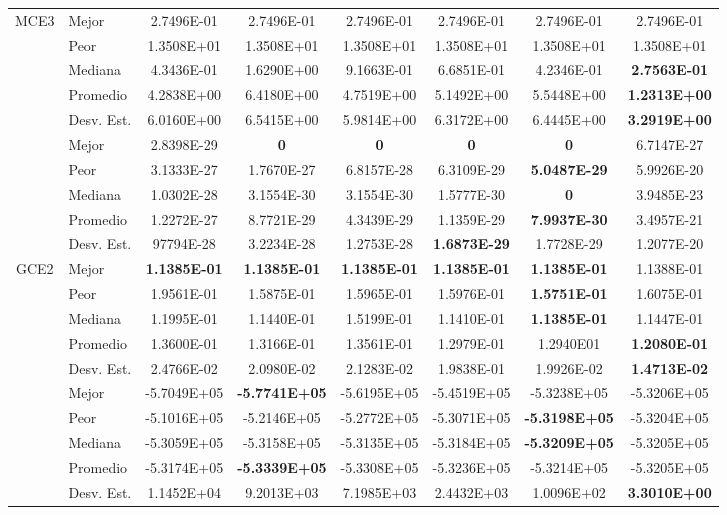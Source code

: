 \begin{table}
{\begin{tabular}{clcccccc}
			\multirow{6}{*}{MCE3} & Mejor       & 2.7496E-01 & 2.7496E-01 & 2.7496E-01 & 2.7496E-01 &  2.7496E-01 & 2.7496E-01 \\
			& Peor        & 1.3508E+01 & 1.3508E+01 & 1.3508E+01 & 1.3508E+01& 1.3508E+01 &  1.3508E+01 \\
			& Mediana     & 4.3436E-01  & 1.6290E+00& 9.1663E-01 & 6.6851E-01& 4.2346E-01 &\textbf{2.7563E-01} \\
			& Promedio    & 4.2838E+00 &  6.4180E+00& 4.7519E+00 & 5.1492E+00 & 5.5448E+00 & \textbf{1.2313E+00} \\
			& Desv. Est.  & 6.0160E+00  & 6.5415E+00& 5.9814E+00 & 6.3172E+00 & 6.4445E+00  &\textbf{3.2919E+00}\\
			\hline
			\multirow{6}{*}{GCE1} & Mejor        &2.8398E-29 & \textbf{0}          & \textbf{0}          &\textbf{0}           & \textbf{0}          &6.7147E-27 \\
			& Peor        & 3.1333E-27 & 1.7670E-27 & 6.8157E-28 & 6.3109E-29 &\textbf{5.0487E-29} & 5.9926E-20\\
			& Mediana     & 1.0302E-28 & 3.1554E-30 & 3.1554E-30 & 1.5777E-30 & \textbf{0}& 3.9485E-23 \\
			& Promedio    & 1.2272E-27 & 8.7721E-29  & 4.3439E-29 &1.1359E-29 & \textbf{7.9937E-30 }& 3.4957E-21 \\
			& Desv. Est.  & 97794E-28 & 3.2234E-28  & 1.2753E-28 & \textbf{1.6873E-29 }& 1.7728E-29  & 1.2077E-20\\
			\hline
			
			\multirow{6}{*}{GCE2} & Mejor        & \textbf{1.1385E-01 }& \textbf{1.1385E-01}  & \textbf{1.1385E-01 }& \textbf{1.1385E-01}& \textbf{1.1385E-01} & 1.1388E-01 \\
			& Peor        & 1.9561E-01 & 1.5875E-01  & 1.5965E-01& 1.5976E-01 & \textbf{1.5751E-01} & 1.6075E-01\\
			& Mediana     & 1.1995E-01& 1.1440E-01  & 1.5199E-01 & 1.1410E-01 & \textbf{1.1385E-01} & 1.1447E-01 \\
			& Promedio    & 1.3600E-01& 1.3166E-01  & 1.3561E-01 & 1.2979E-01 & 1.2940E01 & \textbf{1.2080E-01} \\
			& Desv. Est.   &2.4766E-02 & 2.0980E-02  & 2.1283E-02 & 1.9838E-01& 1.9926E-02 & \textbf{1.4713E-02} \\
			\hline                      
			\multirow{6}{*}{SCE1} & Mejor        & -5.7049E+05&	\textbf{-5.7741E+05}&	-5.6195E+05&	-5.4519E+05&-5.3238E+05 &-5.3206E+05 \\
			& Peor        & -5.1016E+05&	-5.2146E+05&	-5.2772E+05&	-5.3071E+05&	\textbf{-5.3198E+05} &-5.3204E+05 \\
			& Mediana     & -5.3059E+05&	-5.3158E+05&	-5.3135E+05&	-5.3184E+05&	\textbf{-5.3209E+05 }& -5.3205E+05 \\
			& Promedio    & -5.3174E+05&	\textbf{-5.3339E+05}&	-5.3308E+05&	-5.3236E+05&	-5.3214E+05& -5.3205E+05\\
			& Desv. Est.   & 1.1452E+04&	9.2013E+03&	7.1985E+03&	2.4432E+03&	1.0096E+02& \textbf{3.3010E+00}\\
			\hline
			

\end{tabular}}
\end{table}
